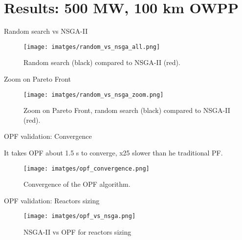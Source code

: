 \section{Results: 500 MW, 100 km OWPP}

\begin{frame}{}
    \tableofcontents[currentsection]
\end{frame}

\begin{frame}{Random search vs NSGA-II}

\begin{figure}
    \centering
    \texttt{[image: imatges/random\_vs\_nsga\_all.png]}
    \caption{Random search (black) compared to NSGA-II (red).}
    \label{fig:random_search}
\end{figure}
    
\end{frame}

\begin{frame}{Zoom on Pareto Front}

    \begin{figure}
        \centering
        \texttt{[image: imatges/random\_vs\_nsga\_zoom.png]}
        \caption{Zoom on Pareto Front, random search (black) compared to NSGA-II (red).}
        \label{fig:random_searchzoom}
    \end{figure}
        
    \end{frame}

\begin{frame}{OPF validation: Convergence}

It takes OPF about 1.5 s to converge, x25 slower than he traditional PF.
    \begin{figure}
        \centering
        \texttt{[image: imatges/opf\_convergence.png]}
        \caption{Convergence of the OPF algorithm.}
        \label{fig:convergence}
    \end{figure}
        
\end{frame}

\begin{frame}{OPF validation: Reactors sizing}

    \begin{figure}
        \centering
        \texttt{[image: imatges/opf\_vs\_nsga.png]}
        \caption{NSGA-II vs OPF for reactors sizing}
        \label{fig:comparision}
    \end{figure}
        
\end{frame}

